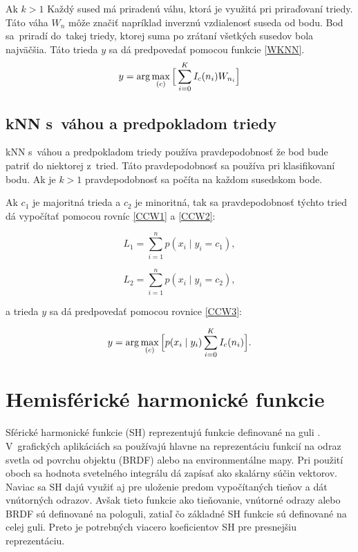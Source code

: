 Ak $k > 1$ Každý sused má priradenú váhu, ktorá je využitá pri priraďovaní triedy. Táto váha $W_n$ môže značiť napríklad inverznú vzdialenosť suseda od bodu. Bod sa~priradí do~takej triedy, ktorej suma po zrátaní všetkých susedov bola najväčšia. Táto trieda $y$ sa dá predpovedať pomocou funkcie \ref{WKNN}.
\begin{equation} \label{WKNN}
    y = \arg \max_{(c)}\Big{[} \sum^{K}_{i=0} I_c(n_i) W_{n_i} \Big{]}
\end{equation}
\subsection*{kNN s~váhou a predpokladom triedy}
kNN s~váhou a predpokladom triedy \cite{KNNSearch} používa pravdepodobnosť že bod bude patriť do niektorej z~tried. Táto pravdepodobnosť sa používa pri klasifikovaní bodu. Ak je $k > 1$ pravdepodobnosť sa počíta na každom susedskom bode.

Ak $c_1$ je majoritná trieda a $c_2$ je minoritná, tak sa pravdepodobnosť týchto tried dá vypočítať pomocou rovníc \ref{CCW1} a \ref{CCW2}:

\begin{equation} \label{CCW1}
    L_1 = \sum^n_{i=1} p(x_i \mid y_i = c_1),
\end{equation}

\begin{equation} \label{CCW2}
    L_2 = \sum^n_{i=1} p(x_i \mid y_i = c_2),
\end{equation}

\noindent a trieda $y$ sa dá predpovedať pomocou rovnice \ref{CCW3}:

\begin{equation} \label{CCW3}
    y = \arg \max_{(c)}\Big{[} p(x_i \mid y_i) \sum^{K}_{i=0} I_c(n_i) \Big{]}.
\end{equation}

\section{Hemisférické harmonické funkcie}
\label{HSHlabel}
Sférické harmonické funkcie (SH) reprezentujú funkcie definované na guli \cite{HSH}. V~grafických aplikáciách sa používajú hlavne na reprezentáciu funkcií na odraz svetla od povrchu objektu (BRDF) alebo na environmentálne mapy. Pri použití oboch sa hodnota svetelného integrálu dá zapísať ako skalárny súčin vektorov. Naviac sa SH dajú využiť aj pre uloženie predom vypočítaných tieňov a dát vnútorných odrazov. Avšak tieto funkcie ako tieňovanie, vnútorné odrazy alebo BRDF sú definované na pologuli, zatiaľ čo základné SH funkcie sú definované na celej guli. Preto je potrebných viacero koeficientov SH pre presnejšiu reprezentáciu.

